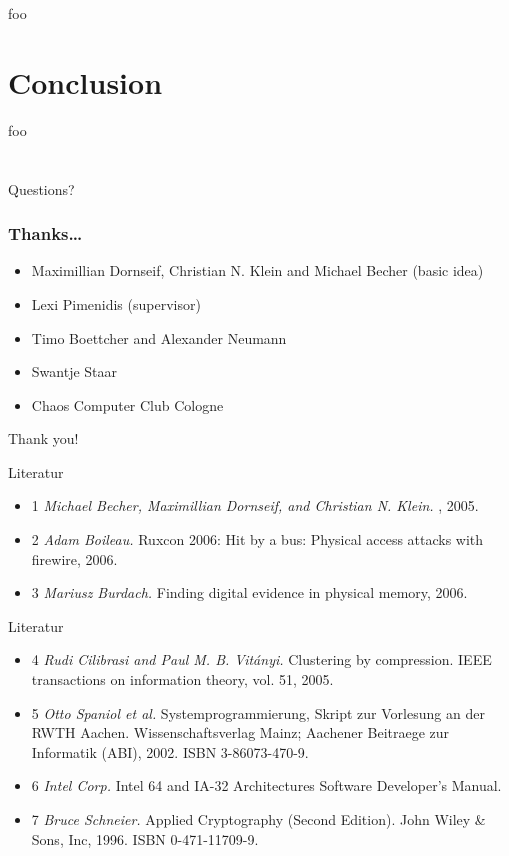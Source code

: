 \documentclass{beamer}
\newenvironment{itemizeframe}[1]
  {\begin{frame}{#1}\startitemizeframe}
  {\stopitemizeframe\end{frame}}
\newcommand\startitemizeframe{\begin{itemize}}
\newcommand\stopitemizeframe{\end{itemize}}
\begin{document}
	\begin{frame}
		foo
	\end{frame}

\section{Conclusion}

	\begin{frame}
		foo
	\end{frame}

\section*{}

	\begin{frame}
		Questions?
	\end{frame}

	\begin{frame}
		\frametitle{Thanks\ldots}
		\begin{itemize}
			\item Maximillian Dornseif, Christian N. Klein and Michael Becher (basic idea)
			\item Lexi Pimenidis (supervisor)
			\item Timo Boettcher and Alexander Neumann
			\item Swantje Staar
			\item Chaos Computer Club Cologne
		\end{itemize}
		Thank you!
	\end{frame}

	\begin{itemizeframe}{Literatur}
		\item[1] \emph{Michael Becher, Maximillian Dornseif, and Christian N.
			Klein.} , 2005.

		\item[2] \emph{Adam Boileau.} Ruxcon 2006: Hit by a bus: Physical access attacks with
			firewire, 2006.

		\item[3] \emph{Mariusz Burdach.} Finding digital evidence in physical memory, 2006.
	\end{itemizeframe}

	\begin{itemizeframe}{Literatur}
		\item[4] \emph{Rudi Cilibrasi and Paul M. B. Vit\'anyi.} Clustering by compression.
			IEEE transactions on information theory, vol. 51, 2005.

		\item[5] \emph{Otto Spaniol et al.} Systemprogrammierung, Skript zur Vorlesung an der RWTH
			Aachen. Wissenschaftsverlag Mainz; Aachener Beitraege zur Informatik (ABI),
			2002. ISBN 3-86073-470-9.
			
		\item[6] \emph{Intel Corp.} Intel 64 and IA-32 Architectures Software Developer’s Manual.

		\item[7] \emph{Bruce Schneier.} Applied Cryptography (Second Edition). John Wiley \& Sons,
			Inc, 1996. ISBN 0-471-11709-9.
	\end{itemizeframe}
\end{document}
